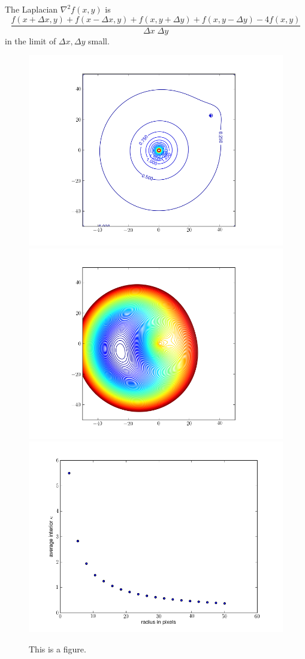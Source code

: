 \documentclass[12pt,preprint]{aastex}
\begin{document}
The Laplacian $\nabla^2 f(x,y)$ is
\begin{equation}
 \frac{ f(x+\Delta x, y) + f(x-\Delta x, y) +
        f(x, y+\Delta y) + f(x, y-\Delta y) - 4 f(x,y) }
      {\Delta x \; \Delta y}
\end{equation}
in the limit of $\Delta x,\Delta y$ small.

\newpage




\newpage

\begin{figure}
\includegraphics[width=.3\hsize]{ASW0000kadC_kappa.png}
\includegraphics[width=.3\hsize]{ASW0000kadC_arriv.png}
\includegraphics[width=.3\hsize]{ASW0000kadC_menc.png}
\caption{This is a figure.\label{fig:ASW0000kad}}
\end{figure}
\end{document}
